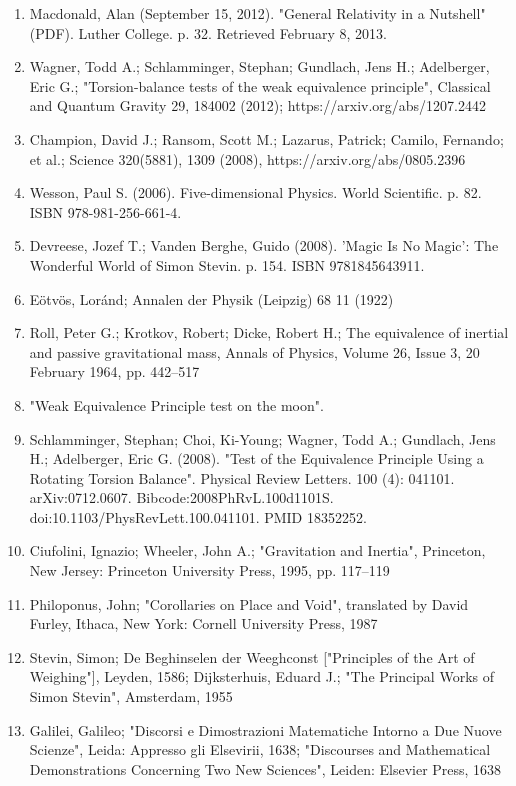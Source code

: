 \begin{enumerate}
\item Macdonald, Alan (September 15, 2012). "General Relativity in a Nutshell" (PDF). Luther College. p. 32. Retrieved February 8, 2013.
\item Wagner, Todd A.; Schlamminger, Stephan; Gundlach, Jens H.; Adelberger, Eric G.; "Torsion-balance tests of the weak equivalence principle", Classical and Quantum Gravity 29, 184002 (2012); https://arxiv.org/abs/1207.2442
\item Champion, David J.; Ransom, Scott M.; Lazarus, Patrick; Camilo, Fernando; et al.; Science 320(5881), 1309 (2008), https://arxiv.org/abs/0805.2396
\item Wesson, Paul S. (2006). Five-dimensional Physics. World Scientific. p. 82. ISBN 978-981-256-661-4.
\item Devreese, Jozef T.; Vanden Berghe, Guido (2008). 'Magic Is No Magic': The Wonderful World of Simon Stevin. p. 154. ISBN 9781845643911.
\item Eötvös, Loránd; Annalen der Physik (Leipzig) 68 11 (1922)
\item Roll, Peter G.; Krotkov, Robert; Dicke, Robert H.; The equivalence of inertial and passive gravitational mass, Annals of Physics, Volume 26, Issue 3, 20 February 1964, pp. 442–517
\item "Weak Equivalence Principle test on the moon".
\item Schlamminger, Stephan; Choi, Ki-Young; Wagner, Todd A.; Gundlach, Jens H.; Adelberger, Eric G. (2008). "Test of the Equivalence Principle Using a Rotating Torsion Balance". Physical Review Letters. 100 (4): 041101. arXiv:0712.0607. Bibcode:2008PhRvL.100d1101S. doi:10.1103/PhysRevLett.100.041101. PMID 18352252.
\item Ciufolini, Ignazio; Wheeler, John A.; "Gravitation and Inertia", Princeton, New Jersey: Princeton University Press, 1995, pp. 117–119
\item Philoponus, John; "Corollaries on Place and Void", translated by David Furley, Ithaca, New York: Cornell University Press, 1987
\item Stevin, Simon; De Beghinselen der Weeghconst ["Principles of the Art of Weighing"], Leyden, 1586; Dijksterhuis, Eduard J.; "The Principal Works of Simon Stevin", Amsterdam, 1955
\item Galilei, Galileo; "Discorsi e Dimostrazioni Matematiche Intorno a Due Nuove Scienze", Leida: Appresso gli Elsevirii, 1638; "Discourses and Mathematical Demonstrations Concerning Two New Sciences", Leiden: Elsevier Press, 1638

\end{enumerate}
